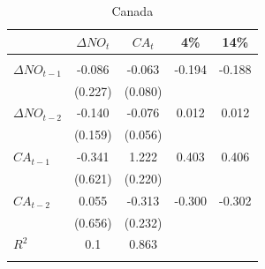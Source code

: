 \documentclass[12pt]{article}
\begin{document}
\begin{table}[h!]
\begin{center}
\caption{Canada}			
\begin{threeparttable}

\begin{tabular}{lcccc}
&$ \Delta NO_{t} $        &$ CA_{t} $				 &4\%				&14\% \\
\hline \\[-1.8ex]

$ \Delta NO_{t - 1} $   &-0.086     &-0.063     &-0.194 	&-0.188	  \\
				                &(0.227)    &(0.080)    &         &         \\
$ \Delta NO_{t - 2} $   &-0.140     &-0.076     & 0.012   & 0.012   \\
				                &(0.159)    &(0.056)    &         &         \\
$ CA_{t - 1} $          &-0.341     & 1.222     & 0.403   & 0.406   \\
				                &(0.621)    &(0.220)    &         &         \\
$ CA_{t - 2} $          & 0.055     &-0.313     &-0.300   &-0.302   \\
				                &(0.656)    &(0.232)    &         &         \\
$ R^{2} $				        & 0.1       & 0.863     &         &         \\
\hline \\[-1.8ex]


\end{tabular}


\end{threeparttable}
\end{center}
\end{table}
\end{document}
